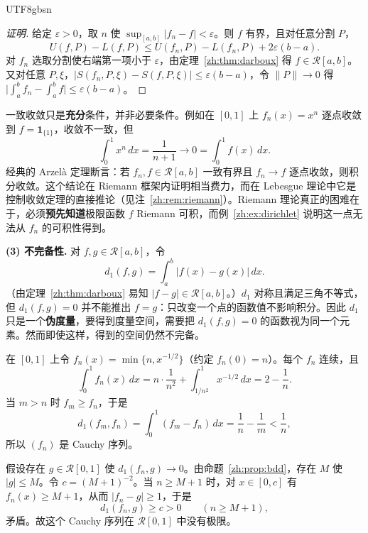 \documentclass[11pt]{article}
\makeatletter
\newcommand{\envlabel}[1]{\protected@edef\@currentlabel{\themathenv}\label{#1}}
\makeatother
\begin{document}
\begin{CJK*}{UTF8}{gbsn}
\begin{proof}[证明]
给定 $\varepsilon>0$，取 $n$ 使 $\sup_{[a,b]}|f_{n}-f|<\varepsilon$。则 $f$ 有界，且对任意分割 $P$，
\[
U(f,P)-L(f,P)\leq U(f_{n},P)-L(f_{n},P)+2\varepsilon(b-a).
\]
对 $f_{n}$ 选取分割使右端第一项小于 $\varepsilon$，由定理~\ref{zh:thm:darboux} 得 $f\in\mathcal{R}[a,b]$。又对任意 $P,\xi$，$|S(f_{n},P,\xi)-S(f,P,\xi)|\leq\varepsilon(b-a)$，令 $\|P\|\to0$ 得 $\big|\int_{a}^{b}f_{n}-\int_{a}^{b}f\big|\leq\varepsilon(b-a)$。
\end{proof}

\begin{remark}\envlabel{zh:rem:unif}
一致收敛只是\textbf{充分}条件，并非必要条件。例如在 $[0,1]$ 上 $f_{n}(x)=x^{n}$ 逐点收敛到 $f=\mathbf{1}_{\{1\}}$，收敛不一致，但
\[
\int_{0}^{1}x^{n}\,dx=\frac{1}{n+1}\to0=\int_{0}^{1}f(x)\,dx.
\]
经典的 Arzelà 定理断言：若 $f_{n},f\in\mathcal{R}[a,b]$ 一致有界且 $f_{n}\to f$ 逐点收敛，则积分收敛。这个结论在 Riemann 框架内证明相当费力，而在 Lebesgue 理论中它是控制收敛定理的直接推论（见注~\ref{zh:rem:riemann}）。Riemann 理论真正的困难在于，必须\textbf{预先知道}极限函数 $f$ Riemann 可积，而例~\ref{zh:ex:dirichlet} 说明这一点无法从 $f_{n}$ 的可积性得到。
\end{remark}

\textbf{(3) 不完备性.} 对 $f,g\in\mathcal{R}[a,b]$，令
\[
d_{1}(f,g)=\int_{a}^{b}|f(x)-g(x)|\,dx.
\]
（由定理~\ref{zh:thm:darboux} 易知 $|f-g|\in\mathcal{R}[a,b]$。）$d_{1}$ 对称且满足三角不等式，但 $d_{1}(f,g)=0$ 并不能推出 $f=g$：只改变一个点的函数值不影响积分。因此 $d_{1}$ 只是一个\textbf{伪度量}，要得到度量空间，需要把 $d_{1}(f,g)=0$ 的函数视为同一个元素。然而即使这样，得到的空间仍然不完备。

\begin{example}\envlabel{zh:ex:incomplete}
在 $[0,1]$ 上令 $f_{n}(x)=\min\{n,x^{-1/2}\}$（约定 $f_{n}(0)=n$）。每个 $f_{n}$ 连续，且
\[
\int_{0}^{1}f_{n}(x)\,dx=n\cdot\frac{1}{n^{2}}+\int_{1/n^{2}}^{1}x^{-1/2}\,dx=2-\frac1n.
\]
当 $m>n$ 时 $f_{m}\geq f_{n}$，于是
\[
d_{1}(f_{m},f_{n})=\int_{0}^{1}(f_{m}-f_{n})\,dx=\frac1n-\frac1m<\frac1n,
\]
所以 $(f_{n})$ 是 Cauchy 序列。

假设存在 $g\in\mathcal{R}[0,1]$ 使 $d_{1}(f_{n},g)\to0$。由命题~\ref{zh:prop:bdd}，存在 $M$ 使 $|g|\leq M$。令 $c=(M+1)^{-2}$。当 $n\geq M+1$ 时，对 $x\in[0,c]$ 有 $f_{n}(x)\geq M+1$，从而 $|f_{n}-g|\geq1$，于是
\[
d_{1}(f_{n},g)\geq c>0\qquad(n\geq M+1),
\]
矛盾。故这个 Cauchy 序列在 $\mathcal{R}[0,1]$ 中没有极限。
\end{example}


\end{CJK*}
\end{document}
